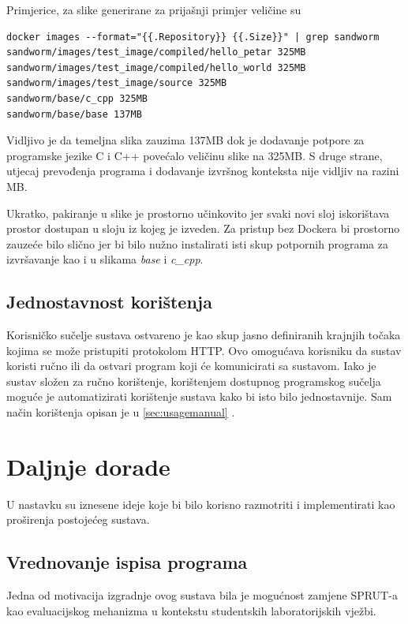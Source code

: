 \documentclass[times, utf8, zavrsni]{fer}
\begin{document}
{{Primjerice, za slike generirane za prijašnji primjer veličine su

\begin{lstlisting}
docker images --format="{{.Repository}} {{.Size}}" | grep sandworm
sandworm/images/test_image/compiled/hello_petar 325MB
sandworm/images/test_image/compiled/hello_world 325MB
sandworm/images/test_image/source 325MB
sandworm/base/c_cpp 325MB
sandworm/base/base 137MB
\end{lstlisting}

Vidljivo je da temeljna slika zauzima 137MB dok je dodavanje potpore za programske jezike C i C++ povećalo veličinu slike na 325MB. S druge strane, utjecaj prevođenja programa i dodavanje izvršnog konteksta nije vidljiv na razini MB.

Ukratko, pakiranje u slike je prostorno učinkovito jer svaki novi sloj iskorištava prostor dostupan u sloju iz kojeg je izveden. Za pristup bez Dockera bi prostorno zauzeće bilo slično jer bi bilo nužno instalirati isti skup potpornih programa za izvršavanje kao i u slikama {\textit{base}} i {\textit{c\_cpp}}.

\section{Jednostavnost korištenja}

Korisničko sučelje sustava ostvareno je kao skup jasno definiranih krajnjih točaka kojima se može pristupiti protokolom HTTP. Ovo omogućava korisniku da sustav koristi ručno ili da ostvari program koji će komunicirati sa sustavom. Iako je sustav složen za ručno korištenje, korištenjem dostupnog programskog sučelja moguće je automatizirati korištenje sustava kako bi isto bilo jednostavnije. Sam način korištenja opisan je u \ref{sec:usagemanual} .

\chapter{Daljnje dorade}

U nastavku su iznesene ideje koje bi bilo korisno razmotriti i implementirati kao proširenja postojećeg sustava.

\section{Vrednovanje ispisa programa}

Jedna od motivacija izgradnje ovog sustava bila je mogućnost zamjene SPRUT-a kao evaluacijskog mehanizma u kontekstu studentskih laboratorijskih vježbi.

}}
\end{document}
